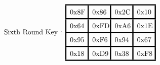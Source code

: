 \[
    \text{Sixth Round Key : }
    \renewcommand{\arraystretch}{1.5}
    \setlength{\arrayrulewidth}{0.6mm}
    \setlength{\tabcolsep}{0.5em}
    \begin{array}{|>{\centering\arraybackslash}m{2em}|>{\centering\arraybackslash}m{2em}|>{\centering\arraybackslash}m{2em}|>{\centering\arraybackslash}m{2em}|}
        \hline
        \text{0x8F} & \text{0x86} & \text{0x2C} & \text{0x10} \\
        \hline
        \text{0x64} & \text{0xFD} & \text{0xA6} & \text{0x1E} \\
        \hline
        \text{0x95} & \text{0xF6} & \text{0x94} & \text{0x67} \\
        \hline
        \text{0x18} & \text{0xD9} & \text{0x38} & \text{0xF8} \\
        \hline
    \end{array}
\]

